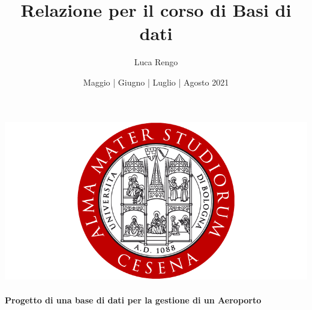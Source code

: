 \documentclass[a4paper, 12pt]{article} %
\begin{document}
	
	\title{Relazione per il corso di Basi di dati}
	\author{Luca Rengo}
	\date{Maggio | Giugno | Luglio | Agosto 2021}
		
	\makeatletter
	\begin{titlepage}
		\begin{center}
			\includegraphics[width=0.7\linewidth]{img/logo/alma_mater_studiorum_cesena_logo.png}\\[4ex]
			{\Huge  \@title }\\[1ex] 
			\textbf{\LARGE Progetto di una base di dati per la gestione di un Aeroporto}\\[2ex] 
			{\large  \@author}\\[2ex] 
			{\large \@date}
		\end{center}
	\end{titlepage}

	\makeatother
	\thispagestyle{empty}
	
	
	\let\cleardoublepage\clearpage
	\tableofcontents
	\setcounter{page}{2}
	
	
	\fancyhf{}

	
	
	
	
	
	
	
	
	
	
	
	
	
\end{document}
